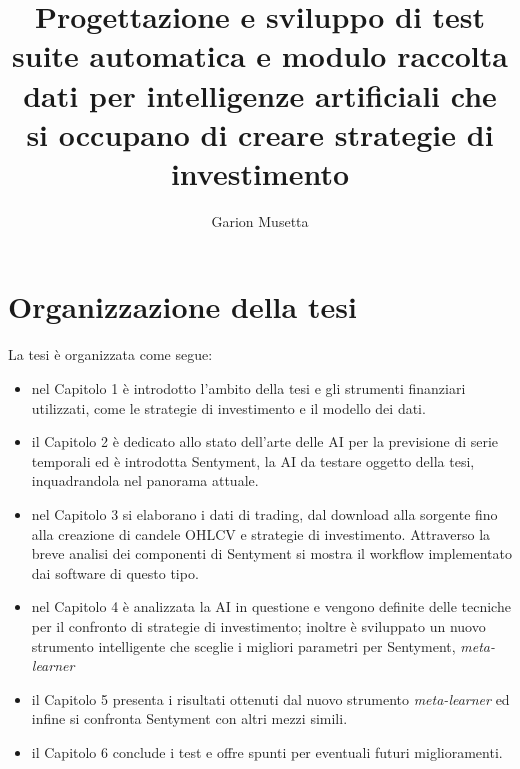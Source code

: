 \documentclass[a4paper,12pt]{report}
\begin{document}
\title{Progettazione e sviluppo di test suite automatica e modulo raccolta dati per intelligenze artificiali che si occupano di creare strategie di investimento}
\author{Garion Musetta}
%
% 
%
\beforepreface
% 
%

%
%
\section*{Organizzazione della tesi}
\label{organizzazione}
La tesi \`e organizzata come segue:
\begin{itemize}
\item nel Capitolo 1 è introdotto l'ambito della tesi e gli strumenti finanziari utilizzati, come le strategie di investimento e il modello dei dati.
\item il Capitolo 2 è dedicato allo stato dell'arte delle AI per la previsione di serie temporali ed è introdotta Sentyment, la AI da testare oggetto della tesi, inquadrandola nel panorama attuale.
\item nel Capitolo 3 si elaborano i dati di trading, dal download alla sorgente fino alla creazione di candele OHLCV e strategie di investimento. Attraverso la breve analisi dei componenti di Sentyment si mostra il workflow implementato dai software di questo tipo.
\item nel Capitolo 4 è analizzata la AI in questione e vengono definite delle tecniche per il confronto di strategie di investimento; inoltre è sviluppato un nuovo strumento intelligente che sceglie i migliori parametri per Sentyment, \textit{meta-learner}
\item il Capitolo 5 presenta i risultati ottenuti dal nuovo strumento \textit{meta-learner} ed infine si confronta Sentyment con altri mezzi simili.
\item il Capitolo 6 conclude i test e offre spunti per eventuali futuri miglioramenti.
\end{itemize}
%
%
\end{document}
